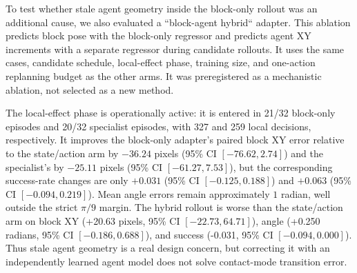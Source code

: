 \documentclass{article}
\begin{document}
To test whether stale agent geometry inside the block-only rollout was an
additional cause, we also evaluated a ``block-agent hybrid`` adapter.  This
ablation predicts block pose with the block-only regressor and predicts agent
XY increments with a separate regressor during candidate rollouts.  It uses
the same cases, candidate schedule, local-effect phase, training size, and
one-action replanning budget as the other arms.  It was preregistered as a
mechanistic ablation, not selected as a new method.

\begin{table}[H]
\centering
\scriptsize
\setlength{\tabcolsep}{3pt}
\caption{Phase-specific local-effect and hybrid-rollout diagnostics over two
seeds and 32 paired held-out cases.  The local-effect probe is privileged and
is invoked only in the near-goal orientation phase.  Success uses the strict
PushT termination criterion; intervals are omitted here for readability and
are recorded in the machine-readable paired summary.}
\label{tab:supp-learned-local-effect}
\end{table}

The local-effect phase is operationally active: it is entered in 21/32
block-only episodes and 20/32 specialist episodes, with 327 and 259 local
decisions, respectively.  It improves the block-only adapter's paired block
XY error relative to the state/action arm by $-36.24$ pixels (95\% CI
$[-76.62,2.74]$) and the specialist's by $-25.11$ pixels (95\% CI
$[-61.27,7.53]$), but the corresponding success-rate changes are only
$+0.031$ (95\% CI $[-0.125,0.188]$) and $+0.063$ (95\% CI
$[-0.094,0.219]$).  Mean angle errors remain approximately $1$ radian,
well outside the strict $\pi/9$ margin.  The hybrid rollout is worse than the
state/action arm on block XY (+20.63 pixels, 95\% CI $[-22.73,64.71]$),
angle (+0.250 radians, 95\% CI $[-0.186,0.688]$), and success (-0.031,
95\% CI $[-0.094,0.000]$).  Thus stale agent geometry is a real design
concern, but correcting it with an independently learned agent model does
not solve contact-mode transition error.
\end{document}
